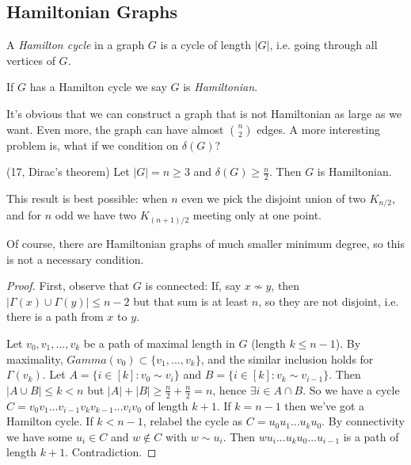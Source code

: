 \documentclass[a4paper]{article}
\begin{document}
\subsection{Hamiltonian Graphs}

\begin{defi}
A \emph{Hamilton cycle} in a graph $G$ is a cycle of length $|G|$, i.e. going through all vertices of $G$.

If $G$ has a Hamilton cycle we say $G$ is \emph{Hamiltonian}.
\end{defi}

It's obvious that we can construct a graph that is not Hamiltonian as large as we want. Even more, the graph can have almost ${n \choose 2}$ edges. A more interesting problem is, what if we condition on $\delta(G)$?

\begin{thm} (17, Dirac's theorem)
Let $|G| = n \geq 3$ and $\delta(G) \geq \frac{n}{2}$. Then $G$ is Hamiltonian.
\end{thm}

\begin{rem}
This result is best possible: when $n$ even we pick the disjoint union of two $K_{n/2}$, and for $n$ odd we have two $K_{(n+1)/2}$ meeting only at one point.

Of course, there are Hamiltonian graphs of much smaller minimum degree, so this is not a necessary condition.

\end{rem}

\begin{proof}
First, observe that $G$ is connected: If, say $x \not\sim y$, then $|\Gamma(x) \cup \Gamma(y)| \leq n-2$ but that sum is at least $n$, so they are not disjoint, i.e. there is a path from $x$ to $y$.

Let $v_0,v_1,...,v_k$ be a path of maximal length in $G$ (length $k \leq n-1$). By maximality, $Gamma(v_0) \subset \{v_1,...,v_k\}$, and the similar inclusion holds for $\Gamma(v_k)$. Let $A = \{i \in [k]:v_0 \sim v_i\}$ and $B = \{i \in [k] : v_k \sim v_{i-1}\}$. Then $|A \cup B| \leq k < n$ but $|A| + |B| \geq \frac{n}{2} + \frac{n}{2} = n$, hence $\exists i \in A \cap B$. So we have a cycle $C = v_0 v_1 ... v_{i-1} v_k v_{k-1} ... v_i v_0$ of length $k+1$. If $k=n-1$ then we've got a Hamilton cycle. If $k < n-1$, relabel the cycle as $C=u_0 u_1 ... u_k u_0$. By connectivity we have some $u_i \in C$ and $w \not \in C$ with $w \sim u_i$. Then $wu_i ... u_k u_0... u_{i-1}$ is a path of length $k+1$. Contradiction.
\end{proof}
\end{document}
